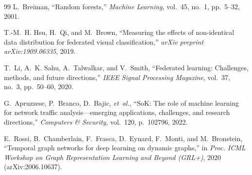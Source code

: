 \documentclass[journal,onecolumn]{IEEEtran}
\begin{document}
\begin{thebibliography}{99}
L.~Breiman, ``Random forests,'' \emph{Machine Learning}, vol.~45, no.~1, pp.~5--32, 2001.

T.-M.~H. Hsu, H.~Qi, and M.~Brown, ``Measuring the effects of non-identical data distribution for federated visual classification,'' \emph{arXiv preprint arXiv:1909.06335}, 2019.

T.~Li, A.~K. Sahu, A.~Talwalkar, and V.~Smith, ``Federated learning: Challenges, methods, and future directions,'' \emph{IEEE Signal Processing Magazine}, vol.~37, no.~3, pp.~50--60, 2020.

G.~Apruzzese, P.~Branco, D.~Bajic, \emph{et~al.}, ``SoK: The role of machine learning for network traffic analysis---emerging applications, challenges, and research directions,'' \emph{Computers \& Security}, vol.~120, p.~102796, 2022.

E.~Rossi, B.~Chamberlain, F.~Frasca, D.~Eynard, F.~Monti, and M.~Bronstein, ``Temporal graph networks for deep learning on dynamic graphs,'' in \emph{Proc. ICML Workshop on Graph Representation Learning and Beyond (GRL+)}, 2020 (arXiv:2006.10637).

\end{thebibliography}
\end{document}
